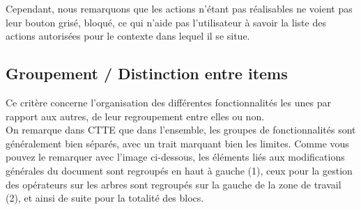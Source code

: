 \documentclass[12pt, a4paper]{article}
\begin{document}
Cependant, nous remarquons que les actions n'étant pas réalisables ne voient pas leur bouton grisé, bloqué, ce qui n'aide pas l'utilisateur à savoir la liste des actions autorisées pour le contexte dans lequel il se situe.
\newpage
\subsection{Groupement / Distinction entre items}
Ce critère concerne l'organisation des différentes fonctionnalités les unes par rapport aux autres, de leur regroupement entre elles ou non.\\


On remarque dans CTTE que dans l'ensemble, les groupes de fonctionnalités sont généralement bien séparés, avec un trait marquant bien les limites. Comme vous pouvez le remarquer avec l'image ci-dessous, les éléments liés aux modifications générales du document sont regroupés en haut à gauche (1), ceux pour la gestion des opérateurs sur les arbres sont regroupés sur la gauche de la zone de travail (2), et ainsi de suite pour la totalité des blocs. 
\end{document}
